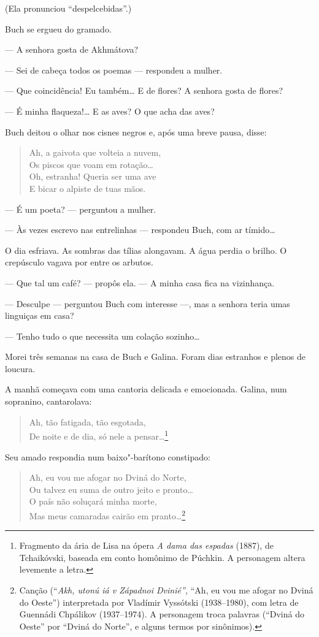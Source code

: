 (Ela pronunciou ``despelcebidas''.)

Buch se ergueu do gramado.

--- A senhora gosta de Akhmátova?

--- Sei de cabeça todos os poemas --- respondeu a mulher.

--- Que coincidência! Eu também\ldots{} E de flores? A senhora gosta de
flores?

--- É minha flaqueza!\ldots{} E as aves? O que acha das aves?

Buch deitou o olhar nos cisnes negros e, após uma breve pausa, disse:

\begin{verse}
Ah, a gaivota que volteia a nuvem,\\
Os piscos que voam em rotação\ldots{}\\
Oh, estranha! Queria ser uma ave\\
E bicar o alpiste de tuas mãos.
\end{verse}

--- É um poeta? --- perguntou a mulher.

--- Às vezes escrevo nas entrelinhas --- respondeu Buch, com ar
tímido\ldots{}

O dia esfriava. As sombras das tílias alongavam. A água perdia o brilho. O crepúsculo vagava por entre os arbutos.

--- Que tal um café? --- propôs ela. --- A minha casa fica na
vizinhança.

--- Desculpe --- perguntou Buch com interesse ---, mas a senhora teria
umas linguiças em casa?

--- Tenho tudo o que necessita um colação sozinho\ldots{}

Morei três semanas na casa de Buch e Galina. Foram dias estranhos e
plenos de loucura.

A manhã começava com uma cantoria delicada e emocionada. Galina, num
sopranino, cantarolava:

\begin{verse}
Ah, tão fatigada, tão esgotada,\\
De noite e de dia, só nele a pensar\ldots{}\footnote{Fragmento da ária de
  Lisa na ópera \emph{A dama das espadas} (1887), de Tchaikóvski,
  baseada em conto homônimo de Púchkin. A personagem altera levemente a
  letra.}
\end{verse}

Seu amado respondia num baixo"-barítono constipado:

\begin{verse}
Ah, eu vou me afogar no Dviná do Norte,\\
Ou talvez eu suma de outro jeito e pronto\ldots{}\\
O país não soluçará minha morte,\\
Mas meus camaradas cairão em pranto\ldots{}\footnote{Canção (``\emph{Akh,
  utonú iá v Západnoi Dvinié'',} ``Ah, eu vou me afogar no Dviná do
  Oeste'') interpretada por Vladímir Vyssótski (1938--1980), com letra
  de Guennádi Chpálikov (1937--1974). A personagem troca palavras
  (``Dviná do Oeste'' por ``Dviná do Norte'', e alguns termos por
  sinônimos).}
\end{verse}

